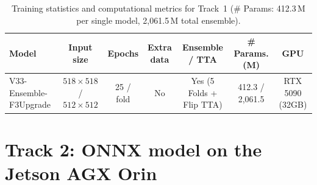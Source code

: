 \documentclass{article}
\begin{document}
\begin{table}[h]
    \centering
    \begin{tabular}{lcccccc}
        \toprule
        Model & Input size & Epochs & Extra data & Ensemble / TTA & \# Params. (M) & GPU \\
        \midrule
        V33-Ensemble-F3Upgrade & $518\times518$ / $512\times512$ & 25 / fold & No & Yes (5 Folds + Flip TTA) & 412.3 / 2,061.5 & RTX 5090 (32GB) \\
        \bottomrule
    \end{tabular}
    \caption{Training statistics and computational metrics for Track~1 (\# Params: 412.3\,M per single model, 2,061.5\,M total ensemble).}
    \label{tab:t1}
\end{table}

\section{Track 2: ONNX model on the Jetson AGX Orin}\label{sec:t2}
\end{document}
